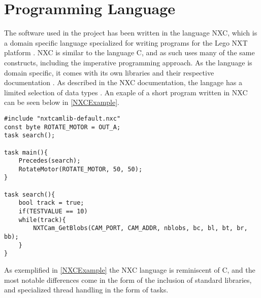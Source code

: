\section{Programming Language}
The software used in the \name project has been written in the language NXC,
which is a domain specific language specialized for writing programs for the
Lego NXT platform \cite{NXCIntro}. NXC is similar to the language C, and as such
uses many of the same constructs, including the imperative programming approach. As the
language is domain specific, it comes with its own libraries and their
respective documentation \cite{NXCIntro}. As described in the NXC documentation,
the langage has a limited selection of data types \cite{NXCVariables}. An exaple
of a short program written in NXC can be seen below in \autoref{NXCExample}.\nl

\begin{minipage}[H]{\linewidth}
\begin{lstlisting}[caption = Exaple of a program written in the NXC language, label = NXCExample] 
#include "nxtcamlib-default.nxc"
const byte ROTATE_MOTOR = OUT_A;
task search();

task main(){
    Precedes(search);
    RotateMotor(ROTATE_MOTOR, 50, 50);
}

task search(){
	bool track = true;
	if(TESTVALUE == 10)
	while(track){
        NXTCam_GetBlobs(CAM_PORT, CAM_ADDR, nblobs, bc, bl, bt, br, bb);
	}
}
\end{lstlisting}
\end{minipage}

As exemplified in \autoref{NXCExample} the NXC language is reminiscent of C, and
the most notable differences come in the form of the inclusion of standard
libraries, and specialized thread handling in the form of tasks.
